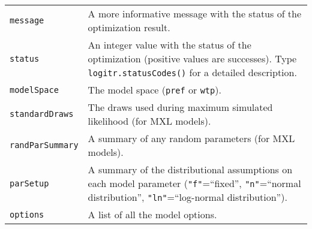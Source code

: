 \documentclass[article]{jss}
\begin{document}
\begin{longtable}[]{@{}ll@{}}
\begin{minipage}[t]{0.21\columnwidth}\raggedright
\texttt{message}\strut
\end{minipage} & \begin{minipage}[t]{0.73\columnwidth}\raggedright
A more informative message with the status of the optimization
result.\strut
\end{minipage}\tabularnewline
\begin{minipage}[t]{0.21\columnwidth}\raggedright
\texttt{status}\strut
\end{minipage} & \begin{minipage}[t]{0.73\columnwidth}\raggedright
An integer value with the status of the optimization (positive values
are successes). Type \texttt{logitr.statusCodes()} for a detailed
description.\strut
\end{minipage}\tabularnewline
\begin{minipage}[t]{0.21\columnwidth}\raggedright
\texttt{modelSpace}\strut
\end{minipage} & \begin{minipage}[t]{0.73\columnwidth}\raggedright
The model space (\texttt{\textquotesingle{}pref\textquotesingle{}} or
\texttt{\textquotesingle{}wtp\textquotesingle{}}).\strut
\end{minipage}\tabularnewline
\begin{minipage}[t]{0.21\columnwidth}\raggedright
\texttt{standardDraws}\strut
\end{minipage} & \begin{minipage}[t]{0.73\columnwidth}\raggedright
The draws used during maximum simulated likelihood (for MXL
models).\strut
\end{minipage}\tabularnewline
\begin{minipage}[t]{0.21\columnwidth}\raggedright
\texttt{randParSummary}\strut
\end{minipage} & \begin{minipage}[t]{0.73\columnwidth}\raggedright
A summary of any random parameters (for MXL models).\strut
\end{minipage}\tabularnewline
\begin{minipage}[t]{0.21\columnwidth}\raggedright
\texttt{parSetup}\strut
\end{minipage} & \begin{minipage}[t]{0.73\columnwidth}\raggedright
A summary of the distributional assumptions on each model parameter
(\texttt{"f"}=``fixed'', \texttt{"n"}=``normal distribution'',
\texttt{"ln"}=``log-normal distribution'').\strut
\end{minipage}\tabularnewline
\begin{minipage}[t]{0.21\columnwidth}\raggedright
\texttt{options}\strut
\end{minipage} & \begin{minipage}[t]{0.73\columnwidth}\raggedright
A list of all the model options.\strut
\end{minipage}\tabularnewline
\bottomrule
\end{longtable}


\end{document}
